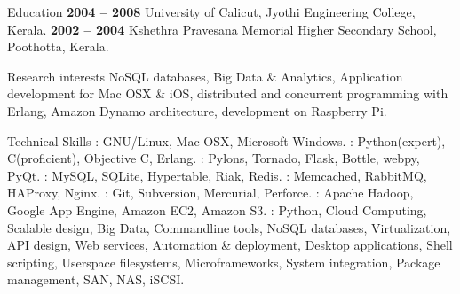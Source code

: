 \documentclass{resume}
\author{Sreejith Kesavan}
\begin{document}
\maketitle


\begin{category}{Education}
   \hfill \textbf{2004 -- 2008}
  \citemnobullet University of Calicut, Jyothi Engineering College, Kerala.
   \hfill \textbf{2002 -- 2004}
  \citemnobullet Kshethra Pravesana Memorial Higher Secondary School, Poothotta, Kerala.
\end{category}


\begin{category}{Research interests}
  \citemnobullet NoSQL databases, Big Data \& Analytics, Application development for Mac OSX \& iOS,
  distributed and concurrent programming with Erlang, Amazon Dynamo architecture, development on Raspberry Pi.
\end{category}

\begin{category}{Technical Skills}
  : GNU/Linux, Mac OSX, Microsoft Windows.
  : Python(expert), C(proficient), Objective C, Erlang.
  : Pylons, Tornado, Flask, Bottle, webpy, PyQt.
  : MySQL, SQLite, Hypertable, Riak, Redis.
  : Memcached, RabbitMQ, HAProxy, Nginx.
  : Git, Subversion, Mercurial, Perforce.
  : Apache Hadoop, Google App Engine, Amazon EC2, Amazon S3.
  : Python, Cloud Computing, Scalable design, Big Data, Commandline 
  tools, NoSQL databases, Virtualization, API design, Web services, Automation \& deployment, 
  Desktop applications, Shell scripting, Userspace filesystems, Microframeworks, System integration, 
  Package management, SAN, NAS, iSCSI.
\end{category}

\end{document}
